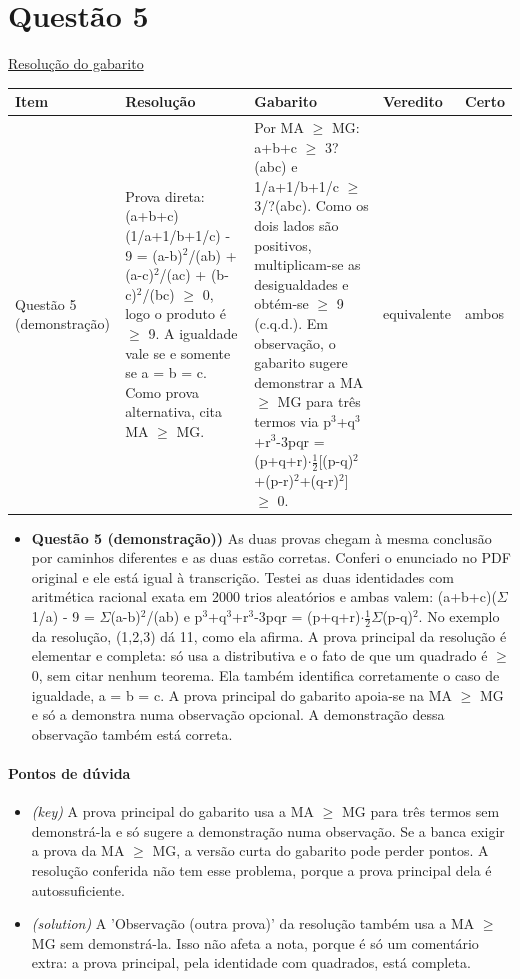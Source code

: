\documentclass{article}%
\begin{document}
\section*{Questão 5}%
\href{https://poliedroresolve.sistemapoliedro.com.br/vestibulares/ime/2026/ime-2-fase-dia-1-23-10-2025-2-fase-dia-1/dissertativa-5-matematica-2-fase-dia-1-ime-2026}{Resolução do gabarito}\par\smallskip%
\begin{longtable}{@{}p{} p{} p{} p{} p{}@{}}\toprule Item & Resolução & Gabarito & Veredito & Certo \\ \midrule
Questão 5 (demonstração) & Prova direta: (a+b+c)(1/a+1/b+1/c) - 9 = (a-b)$^2$/(ab) + (a-c)$^2$/(ac) + (b-c)$^2$/(bc) $\geq$ 0, logo o produto é $\geq$ 9. A igualdade vale se e somente se a = b = c. Como prova alternativa, cita MA $\geq$ MG. & Por MA $\geq$ MG: a+b+c $\geq$ 3?(abc) e 1/a+1/b+1/c $\geq$ 3/?(abc). Como os dois lados são positivos, multiplicam{-}se as desigualdades e obtém{-}se $\geq$ 9 (c.q.d.). Em observação, o gabarito sugere demonstrar a MA $\geq$ MG para três termos via p$^3$+q$^3$+r$^3$-3pqr = (p+q+r)$\cdot$$\frac12${[}(p-q)$^2$+(p-r)$^2$+(q-r)$^2${]} $\geq$ 0. & equivalente & ambos \\
\bottomrule\end{longtable}%
\begin{itemize}%
\item%
\textbf{Questão 5 (demonstração))} As duas provas chegam à mesma conclusão por caminhos diferentes e as duas estão corretas. Conferi o enunciado no PDF original e ele está igual à transcrição. Testei as duas identidades com aritmética racional exata em 2000 trios aleatórios e ambas valem: (a+b+c)($\Sigma$1/a) - 9 = $\Sigma$(a-b)$^2$/(ab) e p$^3$+q$^3$+r$^3$-3pqr = (p+q+r)$\cdot$$\frac12$$\Sigma$(p-q)$^2$. No exemplo da resolução, (1,2,3) dá 11, como ela afirma. A prova principal da resolução é elementar e completa: só usa a distributiva e o fato de que um quadrado é $\geq$ 0, sem citar nenhum teorema. Ela também identifica corretamente o caso de igualdade, a = b = c. A prova principal do gabarito apoia{-}se na MA $\geq$ MG e só a demonstra numa observação opcional. A demonstração dessa observação também está correta.%
\end{itemize}%
\paragraph{Pontos de dúvida}%
\begin{itemize}%
\item%
\textit{(key)} A prova principal do gabarito usa a MA $\geq$ MG para três termos sem demonstrá{-}la e só sugere a demonstração numa observação. Se a banca exigir a prova da MA $\geq$ MG, a versão curta do gabarito pode perder pontos. A resolução conferida não tem esse problema, porque a prova principal dela é autossuficiente.%
\item%
\textit{(solution)} A 'Observação (outra prova)' da resolução também usa a MA $\geq$ MG sem demonstrá{-}la. Isso não afeta a nota, porque é só um comentário extra: a prova principal, pela identidade com quadrados, está completa.%
\end{itemize}%
\end{document}
